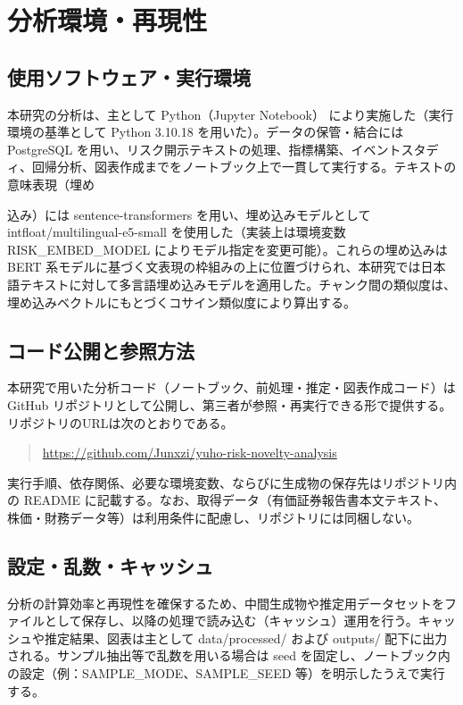 \section{分析環境・再現性}

\subsection{使用ソフトウェア・実行環境}

本研究の分析は、主として Python（Jupyter Notebook） により実施した（実行環境の基準として Python 3.10.18 を用いた）。データの保管・結合には PostgreSQL を用い、リスク開示テキストの処理、指標構築、イベントスタディ、回帰分析、図表作成までをノートブック上で一貫して実行する。テキストの意味表現（埋め

込み）には sentence-transformers を用い、埋め込みモデルとして intfloat/multilingual-e5-small を使用した（実装上は環境変数 RISK\_EMBED\_MODEL によりモデル指定を変更可能）。これらの埋め込みは BERT 系モデルに基づく文表現の枠組みの上に位置づけられ\cite{Devlin2019,ReimersGurevych2019,Wang2022E5}、本研究では日本語テキストに対して多言語埋め込みモデルを適用した。チャンク間の類似度は、埋め込みベクトルにもとづくコサイン類似度により算出する。

\subsection{コード公開と参照方法}

本研究で用いた分析コード（ノートブック、前処理・推定・図表作成コード）は GitHub リポジトリとして公開し、第三者が参照・再実行できる形で提供する。リポジトリのURLは次のとおりである。
\begin{quote}
\url{https://github.com/Junxzi/yuho-risk-novelty-analysis}
\end{quote}
実行手順、依存関係、必要な環境変数、ならびに生成物の保存先はリポジトリ内の README に記載する。なお、取得データ（有価証券報告書本文テキスト、株価・財務データ等）は利用条件に配慮し、リポジトリには同梱しない。

\subsection{設定・乱数・キャッシュ}

分析の計算効率と再現性を確保するため、中間生成物や推定用データセットをファイルとして保存し、以降の処理で読み込む（キャッシュ）運用を行う。キャッシュや推定結果、図表は主として data/processed/ および outputs/ 配下に出力される。サンプル抽出等で乱数を用いる場合は seed を固定し、ノートブック内の設定（例：SAMPLE\_MODE、SAMPLE\_SEED 等）を明示したうえで実行する。

